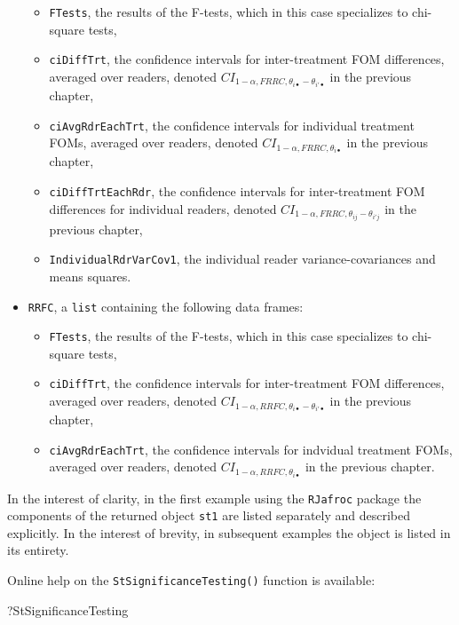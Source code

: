 \documentclass[
]{book}
\newenvironment{Shaded}{\begin{snugshade}}{\end{snugshade}}
\newcommand{\DataTypeTok}[1]{\textcolor[rgb]{0.13,0.29,0.53}{#1}}
\newcommand{\NormalTok}[1]{#1}
\newcommand{\StringTok}[1]{\textcolor[rgb]{0.31,0.60,0.02}{#1}}
\providecommand{\tightlist}{%
  \setlength{\itemsep}{0pt}\setlength{\parskip}{0pt}}
\begin{document}
\begin{itemize}
  \begin{itemize}
  \tightlist
  \item
    \texttt{FTests}, the results of the F-tests, which in this case specializes to chi-square tests,
  \item
    \texttt{ciDiffTrt}, the confidence intervals for inter-treatment FOM differences, averaged over readers, denoted \(CI_{1-\alpha,FRRC,\theta_{i \bullet} - \theta_{i' \bullet}}\) in the previous chapter,
  \item
    \texttt{ciAvgRdrEachTrt}, the confidence intervals for individual treatment FOMs, averaged over readers, denoted \(CI_{1-\alpha,FRRC,\theta_{i \bullet}}\) in the previous chapter,
  \item
    \texttt{ciDiffTrtEachRdr}, the confidence intervals for inter-treatment FOM differences for individual readers, denoted \(CI_{1-\alpha,FRRC,\theta_{ij} - \theta_{i'j}}\) in the previous chapter,
  \item
    \texttt{IndividualRdrVarCov1}, the individual reader variance-covariances and means squares.
  \end{itemize}
\item
  \texttt{RRFC}, a \texttt{list} containing the following data frames:

  \begin{itemize}
  \tightlist
  \item
    \texttt{FTests}, the results of the F-tests, which in this case specializes to chi-square tests,
  \item
    \texttt{ciDiffTrt}, the confidence intervals for inter-treatment FOM differences, averaged over readers, denoted \(CI_{1-\alpha,RRFC,\theta_{i \bullet} - \theta_{i' \bullet}}\) in the previous chapter,
  \item
    \texttt{ciAvgRdrEachTrt}, the confidence intervals for indvidual treatment FOMs, averaged over readers, denoted \(CI_{1-\alpha,RRFC,\theta_{i \bullet}}\) in the previous chapter.
  \end{itemize}
\end{itemize}

In the interest of clarity, in the first example using the \texttt{RJafroc} package the components of the returned object \texttt{st1} are listed separately and described explicitly. In the interest of brevity, in subsequent examples the object is listed in its entirety.

Online help on the \texttt{StSignificanceTesting()} function is available:

\begin{Shaded}
\begin{Highlighting}[]
\NormalTok{?}\StringTok{\textasciigrave{}}\DataTypeTok{StSignificanceTesting}\StringTok{\textasciigrave{}}
\end{Highlighting}
\end{Shaded}
\end{document}
